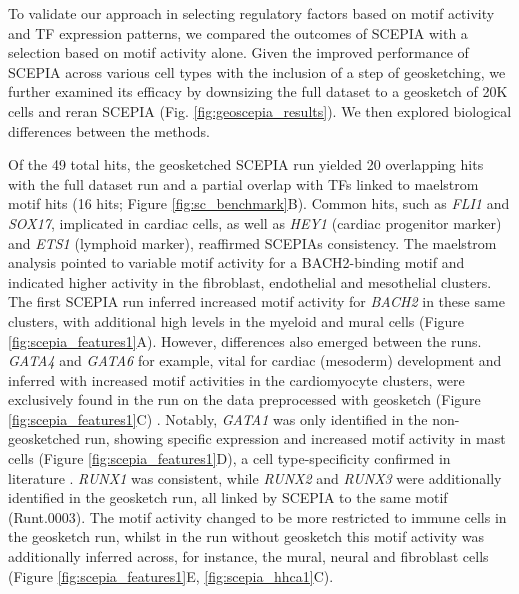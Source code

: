 To validate our approach in selecting regulatory factors based on motif activity and TF expression patterns, we compared the outcomes of SCEPIA with a selection based on motif activity alone. Given the improved performance of SCEPIA across various cell types with the inclusion of a step of geosketching, we further examined its efficacy by downsizing the full dataset to a geosketch of 20K cells and reran SCEPIA (Fig. \ref{fig:geoscepia_results}). We then explored biological differences between the methods.

Of the 49 total hits, the geosketched SCEPIA run yielded 20 overlapping hits with the full dataset run and a partial overlap with TFs linked to maelstrom motif hits (16 hits; Figure \ref{fig:sc_benchmark}B). Common hits, such as \textit{FLI1} and \textit{SOX17}, implicated in cardiac cells, as well as \textit{HEY1} (cardiac progenitor marker) and \textit{ETS1} (lymphoid marker), reaffirmed SCEPIAs consistency. The maelstrom analysis pointed to variable motif activity for a BACH2-binding motif and indicated higher activity in the fibroblast, endothelial and mesothelial clusters. The first SCEPIA run inferred increased motif activity for \textit{BACH2} in these same clusters, with additional high levels in the myeloid and mural cells (Figure \ref{fig:scepia_features1}A). However,  differences also emerged between the runs. \textit{GATA4} and \textit{GATA6} for example, vital for cardiac (mesoderm) development and inferred with increased motif activities in the cardiomyocyte clusters, were exclusively found in the run on the data preprocessed with geosketch (Figure \ref{fig:scepia_features1}C) \cite{Morrisey1996,Song2022}. Notably, \textit{GATA1} was only identified in the non-geosketched run, showing specific expression and increased motif activity in mast cells (Figure \ref{fig:scepia_features1}D), a cell type-specificity confirmed in literature \cite{Migliaccio2003,Gao2015}. \textit{RUNX1} was consistent, while \textit{RUNX2} and \textit{RUNX3} were additionally identified in the geosketch run, all linked by SCEPIA to the same motif (Runt.0003). The motif activity changed to be more restricted to immune cells in the geosketch run, whilst in the run without geosketch this motif activity was additionally inferred across, for instance, the mural, neural and fibroblast cells (Figure \ref{fig:scepia_features1}E, \ref{fig:scepia_hhca1}C).

